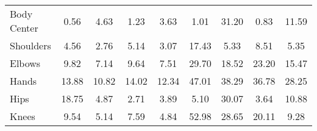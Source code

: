 \documentclass[10pt,twocolumn,letterpaper]{article}
\begin{document}
\begin{table*}[]
{\begin{tabular}{@{}lcccccccc@{}}
Body Center & 0.56                                               & 4.63                                            & 1.23                                             & 3.63                                          & 1.01                                              & 31.20                                          & 0.83                                              & 11.59                                          \\
Shoulders   & 4.56                                               & 2.76                                            & 5.14                                             & 3.07                                          & 17.43                                             & 5.33                                           & 8.51                                              & 5.35                                           \\
Elbows      & 9.82                                               & 7.14                                            & 9.64                                             & 7.51                                          & 29.70                                             & 18.52                                          & 23.20                                             & 15.47                                          \\
Hands       & 13.88                                              & 10.82                                           & 14.02                                            & 12.34                                         & 47.01                                             & 38.29                                          & 36.78                                             & 28.25                                          \\
Hips        & 18.75                                              & 4.87                                            & 2.71                                             & 3.89                                          & 5.10                                              & 30.07                                          & 3.64                                              & 10.88                                          \\
Knees       & 9.54                                               & 5.14                                            & 7.59                                             & 4.84                                          & 52.98                                             & 28.65                                          & 20.11                                             & 9.28                                           \\

\end{tabular}}
\end{table*}
\end{document}
